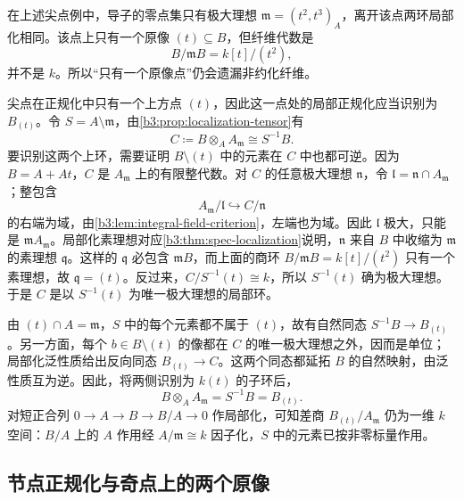 在上述尖点例中，导子的零点集只有极大理想 \(\mathfrak m=(t^2,t^3)_A\)，离开该点两环局部化相同。该点上只有一个原像 \((t)\subseteq B\)，但纤维代数是
\[
	B/\mathfrak mB=k[t]/(t^2),
\]
并不是 \(k\)。所以“只有一个原像点”仍会遗漏非约化纤维。

\ProseParagraphBreak
尖点在正规化中只有一个上方点 \((t)\)，因此这一点处的局部正规化应当识别为 \(B_{(t)}\)。令 \(S=A\setminus\mathfrak m\)，由\cref{b3:prop:localization-tensor}有
\[
	C\coloneqq B\otimes_AA_{\mathfrak m}\cong S^{-1}B.
\]
要识别这两个上环，需要证明 \(B\setminus(t)\) 中的元素在 \(C\) 中也都可逆。因为 \(B=A+At\)，\(C\) 是 \(A_{\mathfrak m}\) 上的有限整代数。对 \(C\) 的任意极大理想 \(\mathfrak n\)，令 \(\mathfrak l=\mathfrak n\cap A_{\mathfrak m}\)；整包含
\[
	A_{\mathfrak m}/\mathfrak l\hookrightarrow C/\mathfrak n
\]
的右端为域，由\cref{b3:lem:integral-field-criterion}，左端也为域。因此 \(\mathfrak l\) 极大，只能是 \(\mathfrak mA_{\mathfrak m}\)。局部化素理想对应\cref{b3:thm:spec-localization}说明，\(\mathfrak n\) 来自 \(B\) 中收缩为 \(\mathfrak m\) 的素理想 \(\mathfrak q\)。这样的 \(\mathfrak q\) 必包含 \(\mathfrak mB\)，而上面的商环 \(B/\mathfrak mB=k[t]/(t^2)\) 只有一个素理想，故 \(\mathfrak q=(t)\)。反过来，\(C/S^{-1}(t)\cong k\)，所以 \(S^{-1}(t)\) 确为极大理想。于是 \(C\) 是以 \(S^{-1}(t)\) 为唯一极大理想的局部环。

\ProseParagraphBreak
由 \((t)\cap A=\mathfrak m\)，\(S\) 中的每个元素都不属于 \((t)\)，故有自然同态 \(S^{-1}B\to B_{(t)}\)。另一方面，每个 \(b\in B\setminus(t)\) 的像都在 \(C\) 的唯一极大理想之外，因而是单位；局部化泛性质给出反向同态 \(B_{(t)}\to C\)。这两个同态都延拓 \(B\) 的自然映射，由泛性质互为逆。因此，将两侧识别为 \(k(t)\) 的子环后，
\[
	B\otimes_AA_{\mathfrak m}=S^{-1}B=B_{(t)}.
\]
对短正合列 \(0\to A\to B\to B/A\to0\) 作局部化，可知差商 \(B_{(t)}/A_{\mathfrak m}\) 仍为一维 \(k\) 空间：\(B/A\) 上的 \(A\) 作用经 \(A/\mathfrak m\cong k\) 因子化，\(S\) 中的元素已按非零标量作用。

\subsection{节点正规化与奇点上的两个原像}\label{b3:subsec:0606:03}

